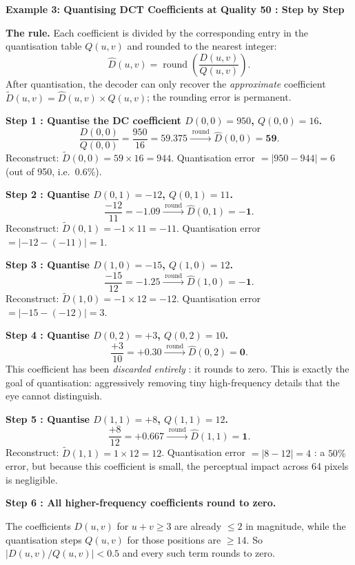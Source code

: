 \begin{examplebox}
\textbf{Example 3: Quantising DCT Coefficients at Quality 50 : Step by Step}

\medskip
\noindent\textbf{The rule.} Each coefficient is divided by the corresponding
entry in the quantisation table $Q(u,v)$ and rounded to the nearest integer:
\[
  \hat{D}(u,v) = \operatorname{round}\!\left(\frac{D(u,v)}{Q(u,v)}\right).
\]
After quantisation, the decoder can only recover the \emph{approximate}
coefficient $\tilde{D}(u,v)=\hat{D}(u,v)\times Q(u,v)$; the rounding error
is permanent.

\medskip
\noindent\textbf{Step 1 : Quantise the DC coefficient $D(0,0)=950$,
                         $Q(0,0)=16$.}
\[
  \frac{D(0,0)}{Q(0,0)} = \frac{950}{16} = 59.375
  \xrightarrow{\;\operatorname{round}\;}
  \hat{D}(0,0) = \mathbf{59}.
\]
Reconstruct: $\tilde{D}(0,0)=59\times16=944$.
Quantisation error $= |950-944| = 6$ (out of 950, i.e.\ $0.6\%$).

\medskip
\noindent\textbf{Step 2 : Quantise $D(0,1)=-12$, $Q(0,1)=11$.}
\[
  \frac{-12}{11} = -1.09
  \xrightarrow{\;\operatorname{round}\;}
  \hat{D}(0,1) = \mathbf{-1}.
\]
Reconstruct: $\tilde{D}(0,1)=-1\times11=-11$.
Quantisation error $= |-12-(-11)|=1$.

\medskip
\noindent\textbf{Step 3 : Quantise $D(1,0)=-15$, $Q(1,0)=12$.}
\[
  \frac{-15}{12} = -1.25
  \xrightarrow{\;\operatorname{round}\;}
  \hat{D}(1,0) = \mathbf{-1}.
\]
Reconstruct: $\tilde{D}(1,0)=-1\times12=-12$.
Quantisation error $= |-15-(-12)|=3$.

\medskip
\noindent\textbf{Step 4 : Quantise $D(0,2)=+3$, $Q(0,2)=10$.}
\[
  \frac{+3}{10} = +0.30
  \xrightarrow{\;\operatorname{round}\;}
  \hat{D}(0,2) = \mathbf{0}.
\]
This coefficient has been \emph{discarded entirely} : it rounds to zero.
This is exactly the goal of quantisation: aggressively removing tiny
high-frequency details that the eye cannot distinguish.

\medskip
\noindent\textbf{Step 5 : Quantise $D(1,1)=+8$, $Q(1,1)=12$.}
\[
  \frac{+8}{12} = +0.667
  \xrightarrow{\;\operatorname{round}\;}
  \hat{D}(1,1) = \mathbf{1}.
\]
Reconstruct: $\tilde{D}(1,1)=1\times12=12$.
Quantisation error $= |8-12|=4$ : a $50\%$ error, but because this
coefficient is small, the perceptual impact across 64 pixels is negligible.

\medskip
\noindent\textbf{Step 6 : All higher-frequency coefficients round to zero.}

The coefficients $D(u,v)$ for $u+v\ge3$ are already $\le 2$ in magnitude,
while the quantisation steps $Q(u,v)$ for those positions are $\ge14$.
So $|D(u,v)/Q(u,v)|<0.5$ and every such term rounds to zero.


\end{examplebox}

